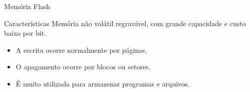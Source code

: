 \begin{frame}[t]{Memória Flash}
  \begin{block}{Características}
    Memória não volátil regravável, com grande capacidade e custo baixo por bit.
  \end{block}
  \begin{itemize}
    \item A escrita ocorre normalmente por páginas.
    \item O apagamento ocorre por blocos ou setores.
    \item É muito utilizada para armazenar programas e arquivos.
  \end{itemize}
  \begin{center}
  \begin{memdiagram}
  \end{memdiagram}
  \end{center}
\end{frame}
